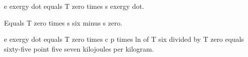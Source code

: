 e exergy dot equals T zero times s exergy dot.

Equals T zero times s six minus s zero.

e exergy dot equals T zero times c p times ln of T six divided by T zero equals sixty-five point five seven kilojoules per kilogram.